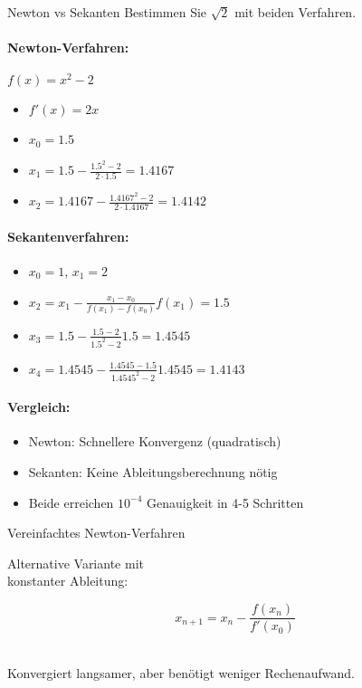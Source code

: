 \begin{example2}{Newton vs Sekanten}
Bestimmen Sie $\sqrt{2}$ mit beiden Verfahren.

\paragraph{Newton-Verfahren:} $f(x) = x^2-2$
\begin{itemize}
    \item $f'(x) = 2x$
    \item $x_0 = 1.5$
    \item $x_1 = 1.5 - \frac{1.5^2-2}{2\cdot1.5} = 1.4167$
    \item $x_2 = 1.4167 - \frac{1.4167^2-2}{2\cdot1.4167} = 1.4142$
\end{itemize}

\paragraph{Sekantenverfahren:}
\begin{itemize}
    \item $x_0 = 1$, $x_1 = 2$
    \item $x_2 = x_1 - \frac{x_1-x_0}{f(x_1)-f(x_0)}f(x_1) = 1.5$
    \item $x_3 = 1.5 - \frac{1.5-2}{1.5^2-2}1.5 = 1.4545$
    \item $x_4 = 1.4545 - \frac{1.4545-1.5}{1.4545^2-2}1.4545 = 1.4143$
\end{itemize}

\paragraph{Vergleich:}
\begin{itemize}
    \item Newton: Schnellere Konvergenz (quadratisch)
    \item Sekanten: Keine Ableitungsberechnung nötig
    \item Beide erreichen $10^{-4}$ Genauigkeit in 4-5 Schritten
\end{itemize}
\end{example2}

\begin{theorem}{Vereinfachtes Newton-Verfahren}\\
    \begin{minipage}{0.5\textwidth}
        Alternative Variante mit \\ konstanter Ableitung:
    \end{minipage}
    \begin{minipage}{0.25\textwidth}
        \vspace{-5mm}
        $$x_{n+1} = x_n - \frac{f(x_n)}{f'(x_0)}$$
    \end{minipage}
    \vspace{1mm}\\
    Konvergiert langsamer, aber benötigt weniger Rechenaufwand.
\end{theorem}

